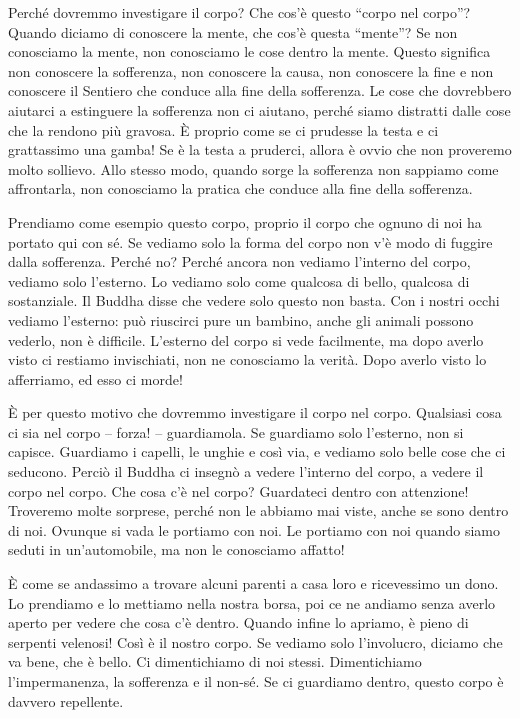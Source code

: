 Perché dovremmo investigare il corpo? Che cos'è questo ``corpo nel
corpo''? Quando diciamo di conoscere la mente, che cos'è questa
``mente''? Se non conosciamo la mente, non conosciamo le cose dentro la
mente. Questo significa non conoscere la sofferenza, non conoscere la
causa, non conoscere la fine e non conoscere il Sentiero che conduce
alla fine della sofferenza. Le cose che dovrebbero aiutarci a estinguere
la sofferenza non ci aiutano, perché siamo distratti dalle cose che la
rendono più gravosa. È proprio come se ci prudesse la testa e ci
grattassimo una gamba! Se è la testa a pruderci, allora è ovvio che non
proveremo molto sollievo. Allo stesso modo, quando sorge la sofferenza
non sappiamo come affrontarla, non conosciamo la pratica che conduce
alla fine della sofferenza.

Prendiamo come esempio questo corpo, proprio il corpo che ognuno di noi
ha portato qui con sé. Se vediamo solo la forma del corpo non v'è modo
di fuggire dalla sofferenza. Perché no? Perché ancora non vediamo
l'interno del corpo, vediamo solo l'esterno. Lo vediamo solo come
qualcosa di bello, qualcosa di sostanziale. Il Buddha disse che vedere
solo questo non basta. Con i nostri occhi vediamo l'esterno: può
riuscirci pure un bambino, anche gli animali possono vederlo, non è
difficile. L'esterno del corpo si vede facilmente, ma dopo averlo visto
ci restiamo invischiati, non ne conosciamo la verità. Dopo averlo visto
lo afferriamo, ed esso ci morde!

È per questo motivo che dovremmo investigare il corpo nel corpo.
Qualsiasi cosa ci sia nel corpo -- forza! -- guardiamola. Se guardiamo
solo l'esterno, non si capisce. Guardiamo i capelli, le unghie e così
via, e vediamo solo belle cose che ci seducono. Perciò il Buddha ci
insegnò a vedere l'interno del corpo, a vedere il corpo nel corpo. Che
cosa c'è nel corpo? Guardateci dentro con attenzione! Troveremo molte
sorprese, perché non le abbiamo mai viste, anche se sono dentro di noi.
Ovunque si vada le portiamo con noi. Le portiamo con noi quando siamo
seduti in un'automobile, ma non le conosciamo affatto!

È come se andassimo a trovare alcuni parenti a casa loro e ricevessimo
un dono. Lo prendiamo e lo mettiamo nella nostra borsa, poi ce ne
andiamo senza averlo aperto per vedere che cosa c'è dentro. Quando
infine lo apriamo, è pieno di serpenti velenosi! Così è il nostro corpo.
Se vediamo solo l'involucro, diciamo che va bene, che è bello. Ci
dimentichiamo di noi stessi. Dimentichiamo l'impermanenza, la
sofferenza e il non-sé. Se ci guardiamo dentro, questo corpo è davvero
repellente.

